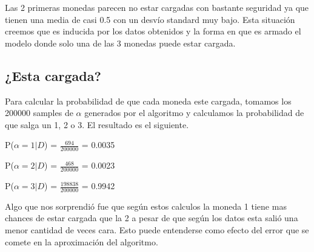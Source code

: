 Las 2 primeras monedas parecen no estar cargadas con bastante seguridad ya que tienen una media de casi 0.5 con un desvío standard muy bajo. Esta situación creemos que es inducida por los datos obtenidos y la forma en que es armado el modelo donde solo una de las 3 monedas puede estar cargada.

\subsection{¿Esta cargada?}

Para calcular la probabilidad de que cada moneda este cargada, tomamos los 200000 samples de $\alpha$ generados por el algoritmo y calculamos la probabilidad de que salga un 1, 2 o 3. El resultado es el siguiente. 


P($\alpha = 1 | D$) = $\frac{694}{200000}$ = 0.0035

P($\alpha = 2 | D$) = $\frac{468}{200000}$ = 0.0023

P($\alpha = 3 | D$) = $\frac{198838}{200000}$ = 0.9942

Algo que nos sorprendió fue que según estos calculos la moneda 1 tiene mas chances de estar cargada que la 2 a pesar de que según los datos esta salió una menor cantidad de veces cara. Esto puede entenderse como efecto del error que se comete en la aproximación del algoritmo.
